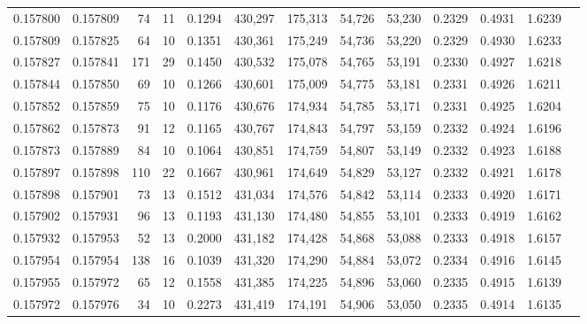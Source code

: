 \begin{tabular}{rrrrrrrrrrrrr}
0.157800 & 0.157809 &    74 &  11 &                                     0.1294 & 430,297 & 175,313 &  54,726 &  53,230 & 0.2329 & 0.4931 & 1.6239 \\
0.157809 & 0.157825 &    64 &  10 &                                     0.1351 & 430,361 & 175,249 &  54,736 &  53,220 & 0.2329 & 0.4930 & 1.6233 \\
0.157827 & 0.157841 &   171 &  29 &                                     0.1450 & 430,532 & 175,078 &  54,765 &  53,191 & 0.2330 & 0.4927 & 1.6218 \\
0.157844 & 0.157850 &    69 &  10 &                                     0.1266 & 430,601 & 175,009 &  54,775 &  53,181 & 0.2331 & 0.4926 & 1.6211 \\
0.157852 & 0.157859 &    75 &  10 &                                     0.1176 & 430,676 & 174,934 &  54,785 &  53,171 & 0.2331 & 0.4925 & 1.6204 \\
0.157862 & 0.157873 &    91 &  12 &                                     0.1165 & 430,767 & 174,843 &  54,797 &  53,159 & 0.2332 & 0.4924 & 1.6196 \\
0.157873 & 0.157889 &    84 &  10 &                                     0.1064 & 430,851 & 174,759 &  54,807 &  53,149 & 0.2332 & 0.4923 & 1.6188 \\
0.157897 & 0.157898 &   110 &  22 &                                     0.1667 & 430,961 & 174,649 &  54,829 &  53,127 & 0.2332 & 0.4921 & 1.6178 \\
0.157898 & 0.157901 &    73 &  13 &                                     0.1512 & 431,034 & 174,576 &  54,842 &  53,114 & 0.2333 & 0.4920 & 1.6171 \\
0.157902 & 0.157931 &    96 &  13 &                                     0.1193 & 431,130 & 174,480 &  54,855 &  53,101 & 0.2333 & 0.4919 & 1.6162 \\
0.157932 & 0.157953 &    52 &  13 &                                     0.2000 & 431,182 & 174,428 &  54,868 &  53,088 & 0.2333 & 0.4918 & 1.6157 \\
0.157954 & 0.157954 &   138 &  16 &                                     0.1039 & 431,320 & 174,290 &  54,884 &  53,072 & 0.2334 & 0.4916 & 1.6145 \\
0.157955 & 0.157972 &    65 &  12 &                                     0.1558 & 431,385 & 174,225 &  54,896 &  53,060 & 0.2335 & 0.4915 & 1.6139 \\
0.157972 & 0.157976 &    34 &  10 &                                     0.2273 & 431,419 & 174,191 &  54,906 &  53,050 & 0.2335 & 0.4914 & 1.6135 \\

\end{tabular}
